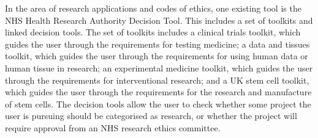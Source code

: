 \documentclass{l4proj}
\begin{document}

In the area of research applications and codes of ethics, one existing tool is the NHS Health Research Authority Decision Tool\cite{NHS}. This includes a set of toolkits and linked decision tools. The set of toolkits includes a clinical trials toolkit, which guides the user through the requirements for testing medicine; a data and tissues toolkit, which guides the user through  the requirements for using human data or human tissue in research; an experimental medicine toolkit, which guides the user through the requirements for interventional research; and a UK stem cell toolkit, which guides the user through the requirements for the research and manufacture of stem cells. The decision tools allow the user to check whether some project the user is pursuing should be categorised as research, or whether the project will require approval from an NHS research ethics committee. 
\end{document}
